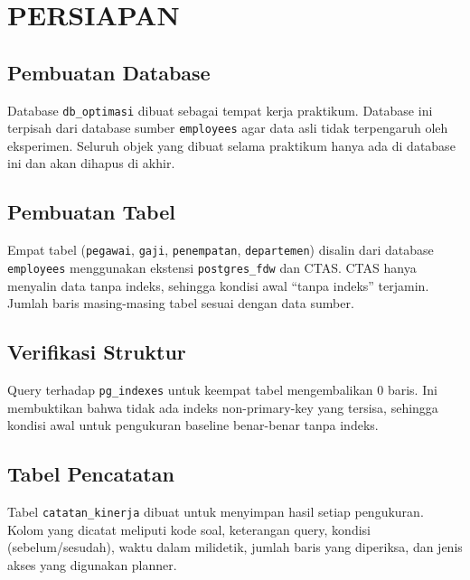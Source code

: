\chapter{PERSIAPAN}

\section{Pembuatan Database}
Database \texttt{db\_optimasi} dibuat sebagai tempat kerja praktikum. Database ini terpisah dari database sumber \texttt{employees} agar data asli tidak terpengaruh oleh eksperimen. Seluruh objek yang dibuat selama praktikum hanya ada di database ini dan akan dihapus di akhir.


\section{Pembuatan Tabel}
Empat tabel (\texttt{pegawai}, \texttt{gaji}, \texttt{penempatan}, \texttt{departemen}) disalin dari database \texttt{employees} menggunakan ekstensi \texttt{postgres\_fdw} dan CTAS. CTAS hanya menyalin data tanpa indeks, sehingga kondisi awal ``tanpa indeks'' terjamin. Jumlah baris masing-masing tabel sesuai dengan data sumber.



\section{Verifikasi Struktur}
Query terhadap \texttt{pg\_indexes} untuk keempat tabel mengembalikan 0 baris. Ini membuktikan bahwa tidak ada indeks non-primary-key yang tersisa, sehingga kondisi awal untuk pengukuran baseline benar-benar tanpa indeks.


\section{Tabel Pencatatan}
Tabel \texttt{catatan\_kinerja} dibuat untuk menyimpan hasil setiap pengukuran. Kolom yang dicatat meliputi kode soal, keterangan query, kondisi (sebelum/sesudah), waktu dalam milidetik, jumlah baris yang diperiksa, dan jenis akses yang digunakan planner.

